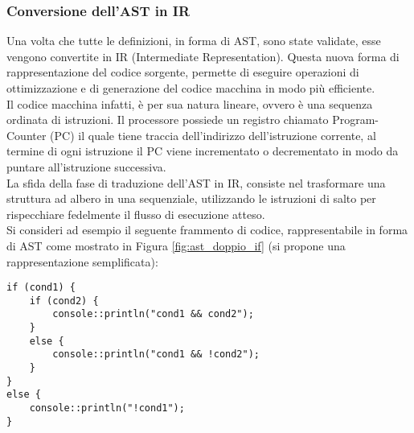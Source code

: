\subsubsection{Conversione dell'AST in IR}
Una volta che tutte le definizioni, in forma di AST, sono state validate, esse vengono convertite in IR 
(Intermediate Representation). Questa nuova forma di rappresentazione del codice sorgente, permette di
eseguire operazioni di ottimizzazione e di generazione del codice macchina in modo più efficiente. \\

Il codice macchina infatti, è per sua natura lineare, ovvero è una sequenza ordinata di istruzioni. Il processore 
possiede un registro chiamato Program-Counter (PC) il quale tiene traccia dell'indirizzo dell'istruzione corrente, 
al termine di ogni istruzione il PC viene incrementato o decrementato in modo da puntare all'istruzione successiva. \\

La sfida della fase di traduzione dell'AST in IR, consiste nel trasformare una struttura ad albero in una sequenziale,
utilizzando le istruzioni di salto per rispecchiare fedelmente il flusso di esecuzione atteso. \\

Si consideri ad esempio il seguente frammento di codice, rappresentabile in forma di AST 
come mostrato in Figura \ref{fig:ast_doppio_if} (si propone una rappresentazione semplificata):

\vspace{0.5cm}
\begin{lstlisting}[frame=single]
if (cond1) {
    if (cond2) {
        console::println("cond1 && cond2");
    }
    else {
        console::println("cond1 && !cond2");
    }
}
else {
    console::println("!cond1");
}    
\end{lstlisting}
\vspace{0.5cm}

